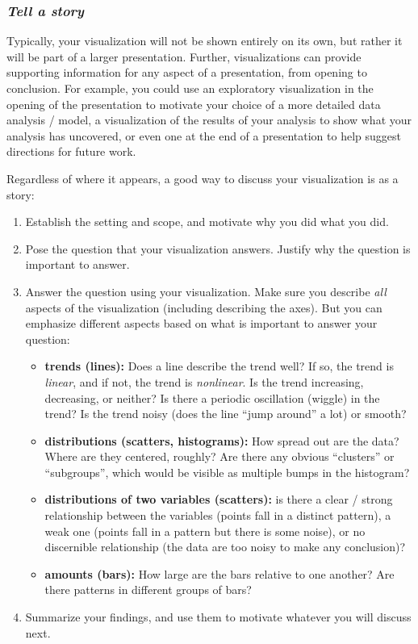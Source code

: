 \documentclass[
]{krantz}
\providecommand{\tightlist}{%
  \setlength{\itemsep}{0pt}\setlength{\parskip}{0pt}}
\begin{document}
\hypertarget{tell-a-story}{%
\subsubsection{\texorpdfstring{\emph{Tell a story}}{Tell a story}}\label{tell-a-story}}

Typically, your visualization will not be shown entirely on its own, but rather it will be part of a larger presentation.
Further, visualizations can provide supporting information for any aspect of a presentation, from opening to conclusion.
For example, you could use an exploratory visualization in the opening of the presentation to motivate your choice
of a more detailed data analysis / model, a visualization of the results of your analysis to show what your analysis has uncovered,
or even one at the end of a presentation to help suggest directions for future work.

Regardless of where it appears, a good way to discuss your visualization is as a story:

\begin{enumerate}
\def\labelenumi{\arabic{enumi})}
\tightlist
\item
  Establish the setting and scope, and motivate why you did what you did.
\item
  Pose the question that your visualization answers. Justify why the question is important to answer.
\item
  Answer the question using your visualization. Make sure you describe \emph{all} aspects of the visualization (including describing the axes). But you
  can emphasize different aspects based on what is important to answer your question:

  \begin{itemize}
  \tightlist
  \item
    \textbf{trends (lines):} Does a line describe the trend well? If so, the trend is \emph{linear}, and if not, the trend is \emph{nonlinear}. Is the trend increasing, decreasing, or neither?
    Is there a periodic oscillation (wiggle) in the trend? Is the trend noisy (does the line ``jump around'' a lot) or smooth?
  \item
    \textbf{distributions (scatters, histograms):} How spread out are the data? Where are they centered, roughly? Are there any obvious ``clusters'' or ``subgroups'', which would be visible as multiple bumps in the histogram?\\
  \item
    \textbf{distributions of two variables (scatters):} is there a clear / strong relationship between the variables (points fall in a distinct pattern), a weak one (points fall in a pattern but there is some noise), or no discernible
    relationship (the data are too noisy to make any conclusion)?
  \item
    \textbf{amounts (bars):} How large are the bars relative to one another? Are there patterns in different groups of bars?
  \end{itemize}
\item
  Summarize your findings, and use them to motivate whatever you will discuss next.
\end{enumerate}
\end{document}
